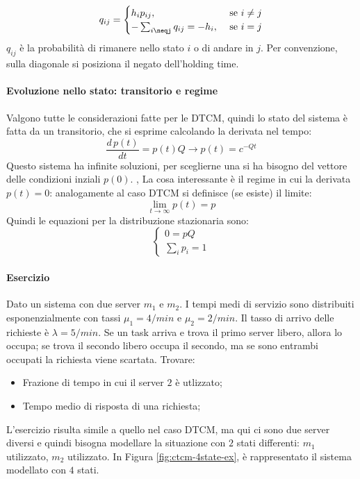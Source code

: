 \documentclass{article}
\begin{document}
\[
  q_{ij} = \begin{cases}
    h_ip_{ij}, &\text{ se }i\neq j\\
    -\sum_{i\neqj}q_{ij} = -h_i, &\text{ se } i = j
  \end{cases}
\]
$q_{ij}$ è la probabilità di rimanere nello stato $i$ o di andare in $j$. Per convenzione, 
sulla diagonale si posiziona il negato dell'holding time.

\paragraph{Evoluzione nello stato: transitorio e regime}
Valgono tutte le considerazioni fatte per le DTCM, quindi lo stato del sistema è fatta da 
un transitorio, che si esprime calcolando la derivata nel tempo:
\[
  \frac{d\,p(t)}{dt} = p(t)Q \to p(t) = c^{-Qt}
\]
Questo sistema ha infinite soluzioni, per sceglierne una si ha bisogno del vettore delle 
condizioni inziali $p(0)$.
,
La cosa interessante è il regime in cui la derivata $p(t) = 0$: analogamente al caso DTCM 
si definisce (se esiste) il limite:
\[
  \lim_{t\to\infty}p(t) = p
\]
Quindi le equazioni per la distribuzione stazionaria sono:
\begin{equation}
  \begin{cases}
    0 = pQ \\
    \sum_ip_i = 1
  \end{cases}
  \label{eq:ctcm-steady-state}
\end{equation}

\paragraph{Esercizio} Dato un sistema con due server $m_1$ e $m_2$. I tempi medi di 
servizio sono  distribuiti esponenzialmente con tassi $\mu_1 = 4/min$ e $\mu_2 = 2/min$. Il 
tasso di arrivo delle richieste è $\lambda = 5/min$. Se un task arriva e trova il primo 
server libero, allora lo occupa; se trova il secondo libero occupa il secondo, ma se sono 
entrambi occupati la richiesta viene scartata. Trovare:
\begin{itemize}
  \item Frazione di tempo in cui il server $2$ è utlizzato;
  \item Tempo medio di risposta di una richiesta;
\end{itemize}
L'esercizio risulta simile a quello nel caso DTCM, ma qui ci sono due server diversi e quindi
bisogna modellare la situazione con $2$ stati differenti: $m_1$ utilizzato, $m_2$ 
utilizzato. In Figura \ref{fig:ctcm-4state-ex}, è rappresentato il sistema modellato con 
$4$ stati.
\end{document}
